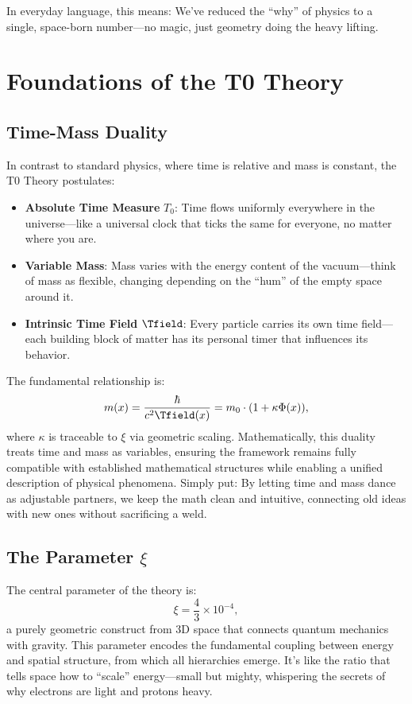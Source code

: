 	In everyday language, this means: We've reduced the ``why'' of physics to a single, space-born number—no magic, just geometry doing the heavy lifting.
	
	\section{Foundations of the T0 Theory}
	
	\subsection{Time-Mass Duality}
	In contrast to standard physics, where time is relative and mass is constant, the T0 Theory postulates:
	\begin{itemize}
		\item \textbf{Absolute Time Measure} $T_0$: Time flows uniformly everywhere in the universe—like a universal clock that ticks the same for everyone, no matter where you are.
		\item \textbf{Variable Mass}: Mass varies with the energy content of the vacuum—think of mass as flexible, changing depending on the ``hum'' of the empty space around it.
		\item \textbf{Intrinsic Time Field} $\Tfield$: Every particle carries its own time field—each building block of matter has its personal timer that influences its behavior.
	\end{itemize}
	
	The fundamental relationship is:
	\[
	m(x) = \frac{\hbar}{c^2 \Tfield(x)} = m_0 \cdot (1 + \kappa \Phi(x)),
	\]
	where $\kappa$ is traceable to $\xi$ via geometric scaling. Mathematically, this duality treats time and mass as variables, ensuring the framework remains fully compatible with established mathematical structures while enabling a unified description of physical phenomena. Simply put: By letting time and mass dance as adjustable partners, we keep the math clean and intuitive, connecting old ideas with new ones without sacrificing a weld.
	
	\subsection{The Parameter $\xi$}
	The central parameter of the theory is:
	\[
	\xi = \frac{4}{3} \times 10^{-4},
	\]
	a purely geometric construct from 3D space that connects quantum mechanics with gravity. This parameter encodes the fundamental coupling between energy and spatial structure, from which all hierarchies emerge. It's like the ratio that tells space how to ``scale'' energy—small but mighty, whispering the secrets of why electrons are light and protons heavy.
	
